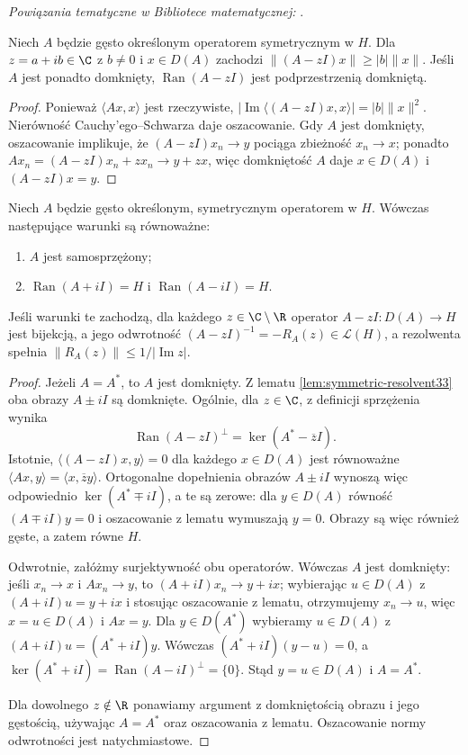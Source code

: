\noindent\emph{Powiązania tematyczne w Bibliotece matematycznej:} .


\begin{lemat}
\label{lem:symmetric-resolvent33}
Niech $A$ będzie gęsto określonym operatorem symetrycznym w $H$.
Dla $z=a+ib\in\C$ z $b\ne0$ i $x\in D(A)$ zachodzi
$\|(A-zI)x\|\ge |b|\|x\|$. Jeśli $A$ jest ponadto domknięty,
$\operatorname{Ran}(A-zI)$ jest podprzestrzenią domkniętą.
\end{lemat}
\begin{proof}
Ponieważ $\langle Ax,x\rangle$ jest rzeczywiste,
$|\operatorname{Im}\langle(A-zI)x,x\rangle|=|b|\|x\|^2$.
Nierówność Cauchy'ego--Schwarza daje oszacowanie.
Gdy $A$ jest domknięty, oszacowanie implikuje, że
$(A-zI)x_n\to y$ pociąga zbieżność $x_n\to x$;
ponadto $Ax_n=(A-zI)x_n+zx_n\to y+zx$, więc
domkniętość $A$ daje $x\in D(A)$ i $(A-zI)x=y$.
\end{proof}

\begin{twierdzenie}
\label{thm:selfadjoint-range33}
Niech $A$ będzie gęsto określonym, symetrycznym operatorem w $H$.
Wówczas następujące warunki są równoważne:
\begin{enumerate}[label=\textup{(\roman*)}]
\item $A$ jest samosprzężony;
\item $\operatorname{Ran}(A+iI)=H$ i $\operatorname{Ran}(A-iI)=H$.
\end{enumerate}
Jeśli warunki te zachodzą, dla każdego $z\in\C\setminus\R$
operator $A-zI:D(A)\to H$ jest bijekcją, a jego odwrotność
$(A-zI)^{-1}=-R_A(z)\in\mathcal L(H)$, a rezolwenta spełnia
$\|R_A(z)\|\le1/|\operatorname{Im}z|$.
\end{twierdzenie}
\begin{proof}
Jeżeli $A=A^*$, to $A$ jest domknięty. Z lematu
\ref{lem:symmetric-resolvent33} oba obrazy $A\pm iI$ są domknięte.
Ogólnie, dla $z\in\C$, z definicji sprzężenia wynika
\[
 \operatorname{Ran}(A-zI)^\perp=\ker(A^*-\overline z I).
\]
Istotnie, $\langle (A-zI)x,y\rangle=0$ dla każdego $x\in D(A)$
jest równoważne $\langle Ax,y\rangle=\langle x,\overline z y\rangle$.
Ortogonalne dopełnienia obrazów $A\pm iI$ wynoszą więc odpowiednio
$\ker(A^*\mp iI)$, a te są zerowe: dla $y\in D(A)$
równość $(A\mp iI)y=0$ i oszacowanie z lematu wymuszają $y=0$.
Obrazy są więc również gęste, a zatem równe $H$.

Odwrotnie, załóżmy surjektywność obu operatorów.
Wówczas $A$ jest domknięty: jeśli $x_n\to x$ i $Ax_n\to y$,
to $(A+iI)x_n\to y+ix$; wybierając $u\in D(A)$
z $(A+iI)u=y+ix$ i stosując oszacowanie z lematu,
otrzymujemy $x_n\to u$, więc $x=u\in D(A)$ i $Ax=y$.
Dla $y\in D(A^*)$ wybieramy $u\in D(A)$ z
$(A+iI)u=(A^*+iI)y$. Wówczas
$(A^*+iI)(y-u)=0$, a
$\ker(A^*+iI)=\operatorname{Ran}(A-iI)^\perp=\{0\}$.
Stąd $y=u\in D(A)$ i $A=A^*$.

Dla dowolnego $z\notin\R$ ponawiamy argument z domkniętością
obrazu i jego gęstością, używając $A=A^*$ oraz oszacowania
z lematu. Oszacowanie normy odwrotności jest natychmiastowe.
\end{proof}

